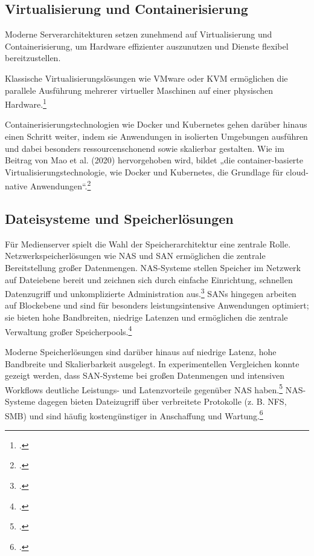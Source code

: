 \documentclass[12pt,a4paper]{report}
\begin{document}
  \subsection{Virtualisierung und Containerisierung}
  Moderne Serverarchitekturen setzen zunehmend auf Virtualisierung und Containerisierung, 
  um Hardware effizienter auszunutzen und Dienste flexibel bereitzustellen. 

  Klassische Virtualisierungslösungen wie VMware oder \ac{KVM} ermöglichen die parallele Ausführung mehrerer 
  virtueller Maschinen auf einer physischen Hardware.\footcite[Vgl.][S.~1005, S.~995~f.]{nemeth_unixlinux} 

  Containerisierungstechnologien wie Docker und Kubernetes gehen darüber hinaus einen Schritt weiter, 
  indem sie Anwendungen in isolierten Umgebungen ausführen und dabei besonders ressourcenschonend sowie 
  skalierbar gestalten. Wie im Beitrag von Mao et al. (2020) hervorgehoben wird, 
  bildet „die container-basierte Virtualisierungstechnologie, 
  wie Docker und Kubernetes, die Grundlage für cloud-native Anwendungen“.\footcite{mao2020containers}

  \subsection{Dateisysteme und Speicherlösungen}
  Für Medienserver spielt die Wahl der Speicherarchitektur eine zentrale Rolle. 
  Netzwerkspeicherlösungen wie \ac{NAS} und \ac{SAN} 
  ermöglichen die zentrale Bereitstellung großer Datenmengen. 
  \ac{NAS}-Systeme stellen Speicher im Netzwerk auf Dateiebene bereit und zeichnen sich durch einfache Einrichtung, 
  schnellen Datenzugriff und unkomplizierte Administration aus.\footcite[Vgl.][S.~21857]{saravanamuthu2014study} 
  \ac{SAN}s hingegen arbeiten auf Blockebene und sind für besonders leistungsintensive Anwendungen optimiert; 
  sie bieten hohe Bandbreiten, niedrige Latenzen und ermöglichen die zentrale Verwaltung großer Speicherpools.\footcite[Vgl.][S.~21858~f.]{saravanamuthu2014study}  

  Moderne Speicherlösungen sind darüber hinaus auf niedrige Latenz, hohe Bandbreite und Skalierbarkeit ausgelegt. 
  In experimentellen Vergleichen konnte gezeigt werden, dass \ac{SAN}-Systeme bei großen Datenmengen und intensiven Workflows deutliche Leistungs- 
  und Latenzvorteile gegenüber \ac{NAS} haben.\footcite[Vgl.][Abschnitt~IV; Ergebnisse]{jaikar2016performance}  
  \ac{NAS}-Systeme dagegen bieten Dateizugriff über verbreitete Protokolle (z. B. \ac{NFS}, \ac{SMB}) 
  und sind häufig kostengünstiger in Anschaffung und Wartung.\footcite[Vgl.][S.~21857]{saravanamuthu2014study}
\end{document}
